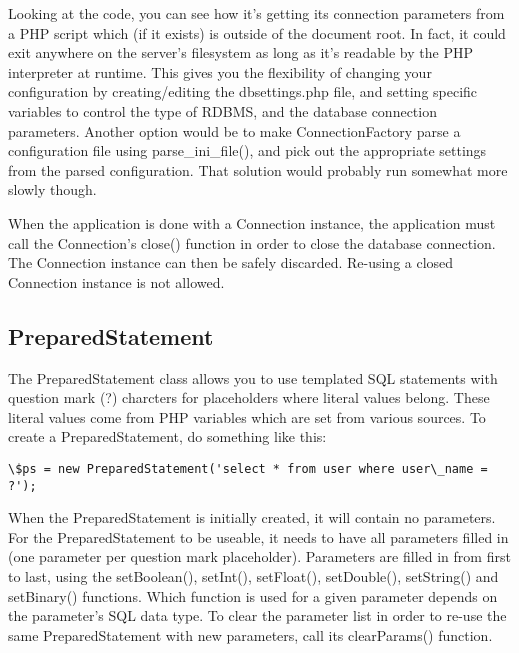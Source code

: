 \documentclass[letterpaper,10pt,english]{sphinxmanual}
\begin{document}
Looking at the code, you can see how it's getting its connection parameters from a PHP script which
(if it exists) is outside of the document root.  In fact, it could exit anywhere on the server's
filesystem as long as it's readable by the PHP interpreter at runtime.  This gives you the
flexibility of changing your configuration by creating/editing the dbsettings.php file, and setting
specific variables to control the type of RDBMS, and the database connection parameters.  Another
option would be to make ConnectionFactory parse a configuration file using parse\_ini\_file(), and
pick out the appropriate settings from the parsed configuration.  That solution would probably run
somewhat more slowly though.

When the application is done with a Connection instance, the application must call the Connection's
close() function in order to close the database connection.  The Connection instance can then be
safely discarded.  Re-using a closed Connection instance is not allowed.


\subsection{PreparedStatement}
\label{jaxFrameworkGuide:preparedstatement}
The PreparedStatement class allows you to use templated SQL statements with question mark (?)
charcters for placeholders where literal values belong.  These literal values come from PHP
variables which are set from various sources.  To create a PreparedStatement, do something like this:

\begin{Verbatim}[commandchars=\\\{\}]
\$ps = new PreparedStatement('select * from user where user\_name = ?');
\end{Verbatim}

When the PreparedStatement is initially created, it will contain no parameters.  For the
PreparedStatement to be useable, it needs to have all parameters filled in (one parameter per
question mark placeholder).  Parameters are filled in from first to last, using the setBoolean(),
setInt(), setFloat(), setDouble(), setString() and setBinary() functions.  Which function is used
for a given parameter depends on the parameter's SQL data type.  To clear the parameter list in
order to re-use the same PreparedStatement with new parameters, call its clearParams() function.
\end{document}
